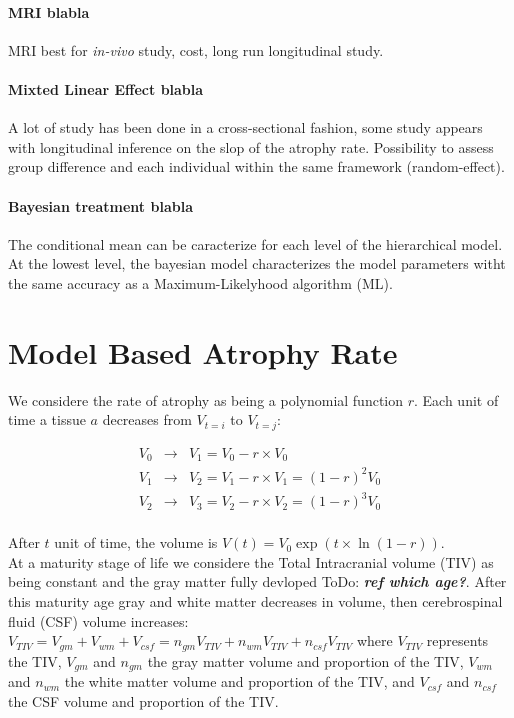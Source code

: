 \documentclass[final, paper=letter,5p,times,twocolumn]{elsarticle}
\newcommand{\ToDo}[1]{ToDo: \textbf{\textit{#1}}}
\theoremstyle{definition}
\begin{document}
\paragraph{MRI blabla}{MRI best for {\it in-vivo} study, cost, long run longitudinal study.}

\paragraph{Mixted Linear Effect blabla}{A lot of study has been done in a cross-sectional fashion, some study appears with longitudinal inference on the slop of the atrophy rate. Possibility to assess group difference and each individual within the same framework (random-effect).}

\paragraph{Bayesian treatment blabla}{The conditional mean can be caracterize for each level of the hierarchical model. At the lowest level, the bayesian model characterizes the model parameters witht the same accuracy as a Maximum-Likelyhood algorithm (ML).}

\section{Model Based Atrophy Rate}

We considere the rate of atrophy as being a polynomial function $r$. Each unit of time a tissue $a$ decreases from $V_{t=i}$ to $V_{t=j}$:

\begin{equation*}
  \left .
  \begin{array}{rcl}
    V_{0} & \rightarrow & V_{1} = V_{0} - r \times V_{0} \\
    V_{1} & \rightarrow & V_{2} = V_{1} - r \times V_{1} = (1-r)^{2}V_{0} \\
    V_{2} & \rightarrow & V_{3} = V_{2} - r \times V_{2} = (1-r)^{3}V_{0} \\
  \end{array}
  \right .
\end{equation*}

After $t$ unit of time, the volume is $V(t) = V_{0}\exp(t \times \ln(1-r))$.\\


At a maturity stage of life we considere the Total Intracranial volume (TIV) as being constant and the gray matter fully devloped \ToDo{ref which age?}. After this maturity age gray and white matter decreases in volume, then cerebrospinal fluid (CSF) volume increases: $V_{TIV} = V_{gm} + V_{wm} + V_{csf} = n_{gm}V_{TIV} + n_{wm}V_{TIV} + n_{csf}V_{TIV}$ where $V_{TIV}$ represents the TIV, $V_{gm}$ and $n_{gm}$ the gray matter volume and proportion of the TIV, $V_{wm}$ and $n_{wm}$ the white matter volume and proportion of the TIV, and $V_{csf}$ and $n_{csf}$ the CSF volume and proportion of the TIV. 
\end{document}
